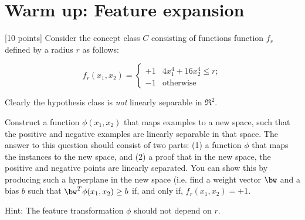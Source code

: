 \section{Warm up: Feature expansion}

[10 points] Consider the concept class $C$ consisting of functions
function $f_r$ defined by a radius $r$ as follows:

\begin{equation}
f_r(x_1, x_2) = \left\{
    \begin{array}{rl}
      +1 & 4x_1^4 + 16x_2^4 \leq r;\\
      -1 & \mbox{otherwise}
    \end{array}
\right.
\label{eq:f_r}
\end{equation}

Clearly the hypothesis class is {\em not} linearly separable in
$\Re^2$. 

Construct a function $\phi(x_1, x_2)$ that maps examples to a new
space, such that the positive and negative examples are linearly
separable in that space. The answer to this question should consist of
two parts: (1) a function $\phi$ that maps the instances to the new
space, and (2) a proof that in the new space, the positive and
negative points are linearly separated. You can show this by producing
such a hyperplane in the new space (i.e. find a weight vector $\bw$
and a bias $b$ such that $\bw^T\phi(x_1, x_2) \geq b$ if, and only if,
$f_r(x_1, x_2) = +1$.

Hint: The feature transformation $\phi$ should not depend on $r$.



